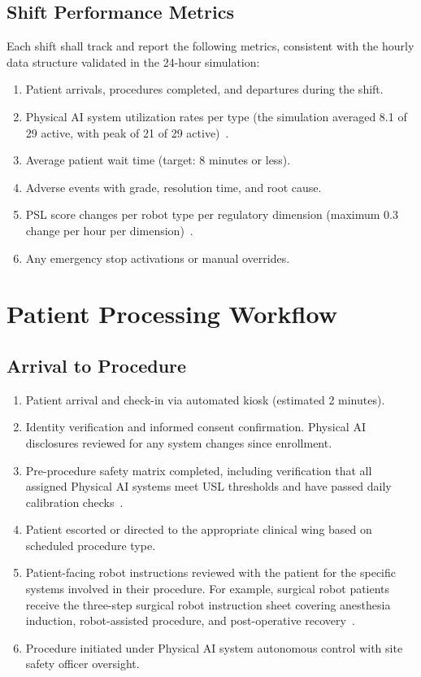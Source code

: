 \documentclass[11pt,letterpaper]{article}
\begin{document}
\subsection{Shift Performance Metrics}

Each shift shall track and report the following metrics, consistent with the
hourly data structure validated in the 24-hour simulation:

\begin{enumerate}[label=(\alph*)]
\item Patient arrivals, procedures completed, and departures during the shift.
\item Physical AI system utilization rates per type (the simulation averaged
  8.1 of 29 active, with peak of 21 of 29 active)~\cite{newtrial2026}.
\item Average patient wait time (target: 8 minutes or less).
\item Adverse events with grade, resolution time, and root cause.
\item PSL score changes per robot type per regulatory dimension (maximum
  0.3 change per hour per dimension)~\cite{pslframework2026}.
\item Any emergency stop activations or manual overrides.
\end{enumerate}

\section{Patient Processing Workflow}

\subsection{Arrival to Procedure}

\begin{enumerate}[label=(\alph*)]
\item Patient arrival and check-in via automated kiosk (estimated 2 minutes).
\item Identity verification and informed consent confirmation. Physical AI
  disclosures reviewed for any system changes since enrollment.
\item Pre-procedure safety matrix completed, including verification that all
  assigned Physical AI systems meet USL thresholds and have passed daily
  calibration checks~\cite{cfr50adapt}.
\item Patient escorted or directed to the appropriate clinical wing based on
  scheduled procedure type.
\item Patient-facing robot instructions reviewed with the patient for the
  specific systems involved in their procedure. For example, surgical robot
  patients receive the three-step surgical robot instruction sheet covering
  anesthesia induction, robot-assisted procedure, and post-operative
  recovery~\cite{patientinstructions2026}.
\item Procedure initiated under Physical AI system autonomous control with
  site safety officer oversight.
\end{enumerate}
\end{document}
